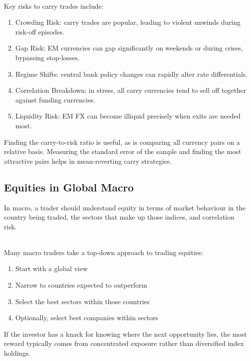 \documentclass[a4paper,oneside,openany]{book}
\begin{document}
\begin{remark} \\
Key risks to carry trades include:
\begin{enumerate}[label=\roman*.]
\setlength{\itemsep}{0pt}
\item Crowding Risk: carry trades are popular, leading to violent unwinds during risk-off episodes.
\item Gap Risk: EM currencies can gap significantly on weekends or during crises, bypassing stop-losses.
\item Regime Shifts: central bank policy changes can rapidly alter rate differentials.
\item Correlation Breakdown: in stress, all carry currencies tend to sell off together against funding currencies.
\item Liquidity Risk: EM FX can become illiquid precisely when exits are needed most.
\end{enumerate}
Finding the carry-to-risk ratio is useful, as is comparing all currency pairs on a relative basis. Measuring the standard error of the sample and finding the most attractive pairs helps in mean-reverting carry strategies.
\end{remark}


\subsection*{Equities in Global Macro}

In macro, a trader should understand equity in terms of market behaviour in the country being traded, the sectors that make up those indices, and correlation risk.

\begin{remark} \\
Many macro traders take a top-down approach to trading equities:
\begin{enumerate}[label=\roman*.]
\setlength{\itemsep}{0pt}
\item Start with a global view
\item Narrow to countries expected to outperform
\item Select the best sectors within those countries
\item Optionally, select best companies within sectors
\end{enumerate}
If the investor has a knack for knowing where the next opportunity lies, the most reward typically comes from concentrated exposure rather than diversified index holdings.
\end{remark}
\end{document}
